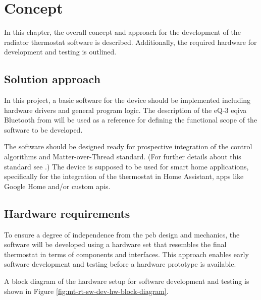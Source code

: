 %
%

\chapter{Concept}
\label{chap:Concept}
In this chapter, the overall concept and approach for the development of the radiator thermostat software is described. Additionally, the required hardware for development and testing is outlined.

\section{Solution approach}
\label{sec:Solution approach}
In this project, a basic software for the device should be implemented including hardware drivers and general program logic. The description of the eQ-3 eqiva Bluetooth from \cite{eQ3AG.05.2018} will be used as a reference for defining the functional scope of the software to be developed.

The software should be designed ready for prospective integration of the control algorithms and Matter-over-Thread standard. (For further details about this standard see \cite{enwiki:matter}.) The device is supposed to be used for smart home applications, specifically for the integration of the thermostat in Home Assistant, apps like Google Home and/or custom \acp{api}.

\section{Hardware requirements}
\label{sec:Hardware requirements}

To ensure a degree of independence from the \acs{pcb} design and mechanics, the software will be developed using a hardware set that resembles the final thermostat in terms of components and interfaces. This approach enables early software development and testing before a hardware prototype is available.

A block diagram of the hardware setup for software development and testing is shown in Figure \ref{fig:mt-rt-sw-dev-hw-block-diagram}.

